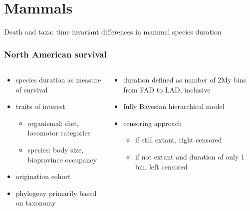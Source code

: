 \documentclass{beamer}
\begin{document}
\section{Mammals}
\begin{frame}
  Death and taxa: time invariant differences in mammal species duration
\end{frame}

\begin{frame}
  \frametitle{North American survival}
  \begin{columns}
    \begin{column}{0.5\textwidth}
      \begin{itemize}
        \item species duration as measure of survival
        \item traits of interest
          \begin{itemize}
            \item organismal: diet, locomotor categories
            \item species: body size, bioprovince occupancy
          \end{itemize}
        \item origination cohort
        \item phylogeny primarily based on taxonomy
      \end{itemize}
    \end{column}
    \begin{column}{0.5\textwidth}
      \begin{itemize}
        \item duration defined as number of 2My bins from FAD to LAD, inclusive
        \item fully Bayesian hierarchical model
        \item censoring approach
          \begin{itemize}
            \item if still extant, right censored
            \item if not extant and duration of only 1 bin, left censored
          \end{itemize}
      \end{itemize}
    \end{column}
  \end{columns}
\end{frame}
\end{document}
